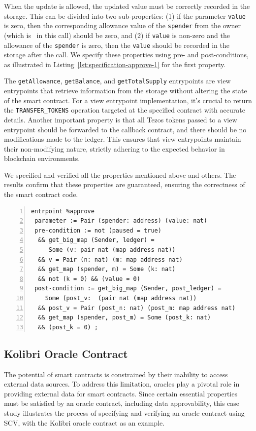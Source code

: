 \documentclass[runningheads]{llncs}
\begin{document}
When the update is allowed, the updated value must be correctly recorded in the storage. This can be divided into two sub-properties: (1) if the parameter \lstinline/value/ is zero, then the corresponding allowance value of the \lstinline/spender/ from the owner (which is \SENDER\ in this call) should be zero, and (2) if \lstinline/value/ is non-zero and the allowance of the \lstinline/spender/ is zero, then the \lstinline/value/ should be recorded in the storage after the call. We specify these properties using pre- and post-conditions, as illustrated in Listing~\ref{lst:specification-approve-1} for the first property.

The \lstinline/getAllowance/, \lstinline/getBalance/, and \lstinline/getTotalSupply/ entrypoints are view entrypoints that retrieve information from the storage without altering the state of the smart contract. For a view entrypoint implementation, it's crucial to return the \lstinline/TRANSFER_TOKENS/ operation targeted at the specified contract with accurate details. Another important property is that all Tezos tokens passed to a view entrypoint should be forwarded to the callback contract, and there should be no modifications made to the ledger. This ensures that view entrypoints maintain their non-modifying nature, strictly adhering to the expected behavior in blockchain environments.

We specified and verified all the properties mentioned above and others. The results confirm that these properties are guaranteed, ensuring the correctness of the smart contract code.
\begin{lstlisting}[float=tp,captionpos=b,caption={Specification of the \lstinline/approve/ entrypoint (Property 1)},label={lst:specification-approve-1},numbers=left]
entrpoint %approve
 parameter := Pair (spender: address) (value: nat)
 pre-condition := not (paused = true)
  && get_big_map (Sender, ledger) = 
     Some (v: pair nat (map address nat))
  && v = Pair (n: nat) (m: map address nat) 
  && get_map (spender, m) = Some (k: nat) 
  && not (k = 0) && (value = 0)
 post-condition := get_big_map (Sender, post_ledger) = 
    Some (post_v:  (pair nat (map address nat))
  && post_v = Pair (post_n: nat) (post_m: map address nat) 
  && get_map (spender, post_m) = Some (post_k: nat) 
  && (post_k = 0) ;
\end{lstlisting}

\subsection{Kolibri Oracle Contract}
\label{sec:kolibri-oracle-contr}
The potential of smart contracts is constrained by their inability to access external data sources. To address this limitation, oracles play a pivotal role in providing external data for smart contracts. Since certain essential properties must be satisfied by an oracle contract, including data approvability, this case study illustrates the process of specifying and verifying an oracle contract using SCV, with the Kolibri oracle contract \cite{kolibri} as an example.
\end{document}
